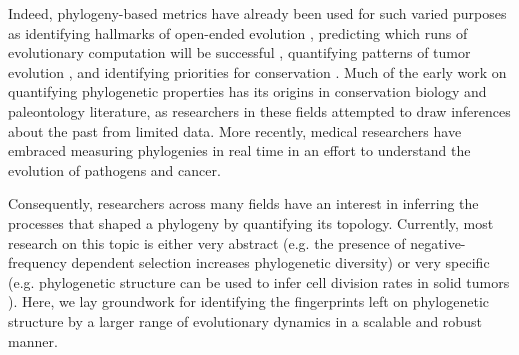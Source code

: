 Indeed, phylogeny-based metrics have already been used for such varied purposes as identifying hallmarks of open-ended evolution \citep{dolsonMODESToolboxMeasurements2019}, predicting which runs of evolutionary computation will be successful \citep{hernandezWhatCanPhylogenetic2022a, shahbandeganUntanglingPhylogeneticDiversity2022a}, quantifying patterns of tumor evolution \citep{scottInferringTumorProliferative2020, lewinsohnStatedependentEvolutionaryModels2023}, and identifying priorities for conservation \citep{forestPreservingEvolutionaryPotential2007}.
Much of the early work on quantifying phylogenetic properties has its origins in conservation biology and paleontology literature, as researchers in these fields attempted to draw inferences about the past from limited data.
More recently, medical researchers have embraced measuring phylogenies in real time in an effort to understand the evolution of pathogens and cancer.

Consequently, researchers across many fields have an interest in inferring the processes that shaped a phylogeny by quantifying its topology.
Currently, most research on this topic is either very abstract (e.g. the presence of negative-frequency dependent selection increases phylogenetic diversity) or very specific (e.g. phylogenetic structure can be used to infer cell division rates in solid tumors \citep{lewinsohnStatedependentEvolutionaryModels2023}).
Here, we lay groundwork for identifying the fingerprints left on phylogenetic structure by a larger range of evolutionary dynamics in a scalable and robust manner.


